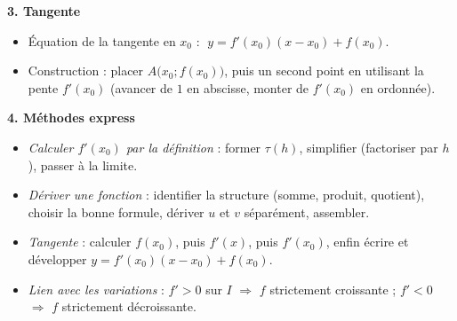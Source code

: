 \documentclass[11pt]{article}
\begin{document}
\begin{bilan}
\textbf{3. Tangente}
\begin{itemize}
  \item Équation de la tangente en $x_0$ : $\;y=f'(x_0)(x-x_0)+f(x_0)$.
  \item Construction : placer $A\bigl(x_0;f(x_0)\bigr)$, puis un second point en utilisant la pente $f'(x_0)$ (avancer de $1$ en abscisse, monter de $f'(x_0)$ en ordonnée).
\end{itemize}

\textbf{4. Méthodes express}
\begin{itemize}
  \item \emph{Calculer $f'(x_0)$ par la définition} : former $\tau(h)$, simplifier (factoriser par $h$), passer à la limite.
  \item \emph{Dériver une fonction} : identifier la structure (somme, produit, quotient), choisir la bonne formule, dériver $u$ et $v$ séparément, assembler.
  \item \emph{Tangente} : calculer $f(x_0)$, puis $f'(x)$, puis $f'(x_0)$, enfin écrire et développer $y=f'(x_0)(x-x_0)+f(x_0)$.
  \item \emph{Lien avec les variations} : $f'>0$ sur $I$ $\Rightarrow$ $f$ strictement croissante ; $f'<0$ $\Rightarrow$ $f$ strictement décroissante.
\end{itemize}
\end{bilan}
\end{document}
